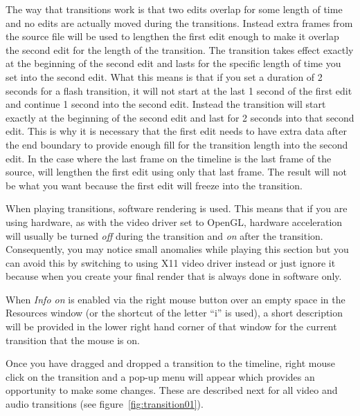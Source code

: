 The way that transitions work is that two edits overlap for some length of time and no edits are actually moved during the transitions.
Instead extra frames from the source file will be used to lengthen the first edit enough to make it overlap the second edit for the length of the transition. The transition takes effect exactly at the beginning of the second edit and lasts for the specific length of time you set into the second edit. 
What this means is that if you set a duration of 2 seconds for a flash transition, it will not start at the last 1 second of the first edit and continue 1 second into the second edit. Instead the transition will start exactly at the beginning of the second edit and last for 2 seconds into that second edit. 
This is why it is necessary that the first edit needs to have extra data after the end boundary to provide enough fill for the transition length into the second edit.
In the case where the last frame on the timeline is the last frame of the source, \CGG{} will lengthen the first edit using only that last frame.  The result will not be what you want because the first edit will freeze into the transition.

When playing transitions, software rendering is used.  This means that if you are using hardware, as with the video driver set to OpenGL, hardware acceleration will usually be turned \textit{off} during the transition and \textit{on} after the transition. Consequently, you may notice small anomalies while playing this section but you can avoid this by switching to using X11 video driver instead or just ignore it because when you create your final render that is always done in software only.
    
When \textit{Info on} is enabled via the right mouse button over an empty space in the Resources window (or the shortcut of the letter “i” is used), a short description will be provided in the lower right hand corner of that window for the current transition that the mouse is on.

Once you have dragged and dropped a transition to the timeline, right mouse click on the transition and a pop-up menu will appear which provides an opportunity to make some changes.  These are described next for all video and audio transitions (see figure~\ref{fig:transition01}). 

